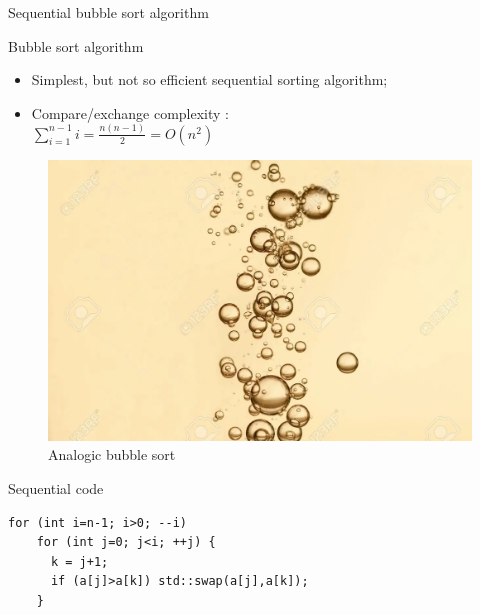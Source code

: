 \documentclass[compress,10pt,aspectratio=169]{beamer}
\begin{document}
\begin{frame}[fragile]{Sequential bubble sort algorithm}
  \scriptsize
  \begin{multicols}{2}
  \begin{block}{Bubble sort algorithm}
    \begin{itemize}
    \item Simplest, but not so efficient sequential sorting algorithm;
    \item Compare/exchange complexity :\\
      $\displaystyle
      \sum_{i=1}^{n-1}i = \frac{n(n-1)}{2} = O(n^{2})
      $
    \end{itemize}
  \end{block}

  \begin{figure}[h]
    \includegraphics[width=0.5\linewidth]{../Images/bulles.jpg}
    \caption{Analogic bubble sort}
  \end{figure}
  \end{multicols}
  
  \begin{exampleblock}{Sequential code}
    \begin{verbatim}
for (int i=n-1; i>0; --i)
    for (int j=0; j<i; ++j) {
      k = j+1;
      if (a[j]>a[k]) std::swap(a[j],a[k]);
    }
    \end{verbatim}
  \end{exampleblock}
\end{frame}
\end{document}
